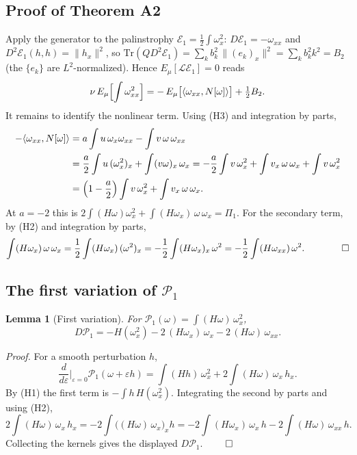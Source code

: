 \documentclass[11pt]{article}
\newtheorem{lemma}[theorem]{Lemma}
\theoremstyle{remark}
\theoremstyle{plain}
\begin{document}
\subsection{Proof of Theorem A2}

Apply the generator to the palinstrophy $\mathcal{E}_1 = \tfrac12\int\omega_x^2$:
$D\mathcal{E}_1 = -\omega_{xx}$ and $D^2\mathcal{E}_1(h,h) = \|h_x\|^2$, so
$\mathrm{Tr}(Q D^2\mathcal{E}_1) = \sum_k b_k^2\,\|(e_k)_x\|^2 = \sum_k b_k^2 k^2 = B_2$
(the $\{e_k\}$ are $L^2$-normalized). Hence $E_\mu[\mathcal{L}\mathcal{E}_1] = 0$ reads
\begin{equation}
  \nu\,E_\mu\Bigl[\int\omega_{xx}^2\Bigr]
  = -\,E_\mu\bigl[\langle\omega_{xx}, N[\omega]\rangle\bigr] + \tfrac12 B_2 .
\end{equation}
It remains to identify the nonlinear term. Using (H3) and integration by parts,
\begin{align}
  -\langle\omega_{xx}, N[\omega]\rangle
  &= a\int u\,\omega_x\omega_{xx} - \int v\,\omega\,\omega_{xx} \notag\\
  &= \frac a2\int u\,(\omega_x^2)_x + \int (v\omega)_x\,\omega_x
  = -\frac a2\int v\,\omega_x^2 + \int v_x\,\omega\,\omega_x + \int v\,\omega_x^2 \notag\\
  &= \Bigl(1 - \frac a2\Bigr)\int v\,\omega_x^2 + \int v_x\,\omega\,\omega_x .
\end{align}
At $a = -2$ this is $2\int(H\omega)\omega_x^2 + \int(H\omega_x)\,\omega\,\omega_x = \Pi_1$. For the
secondary term, by (H2) and integration by parts,
\begin{equation}
  \int (H\omega_x)\,\omega\,\omega_x = \frac12\int (H\omega_x)\,(\omega^2)_x
  = -\frac12\int (H\omega_x)_x\,\omega^2 = -\frac12\int (H\omega_{xx})\,\omega^2 . \qquad\qed
\end{equation}

\subsection{The first variation of $\mathcal{P}_1$}

\begin{lemma}[First variation]\label{lem:dp1}
For $\mathcal{P}_1(\omega) = \int (H\omega)\,\omega_x^2$,
\begin{equation}
  D\mathcal{P}_1 = -H(\omega_x^2) - 2\,(H\omega_x)\,\omega_x - 2\,(H\omega)\,\omega_{xx} .
\end{equation}
\end{lemma}

\emph{Proof.} For a smooth perturbation $h$,
\begin{equation}
  \frac{d}{d\varepsilon}\Big|_{\varepsilon=0}\mathcal{P}_1(\omega + \varepsilon h)
  = \int (Hh)\,\omega_x^2 + 2\int (H\omega)\,\omega_x\, h_x .
\end{equation}
By (H1) the first term is $-\int h\,H(\omega_x^2)$. Integrating the second by parts and
using (H2),
\begin{equation}
  2\int (H\omega)\,\omega_x\, h_x = -2\int \bigl((H\omega)\,\omega_x\bigr)_x h
  = -2\int (H\omega_x)\,\omega_x\, h - 2\int (H\omega)\,\omega_{xx}\, h .
\end{equation}
Collecting the kernels gives the displayed $D\mathcal{P}_1$. $\qed$
\end{document}
